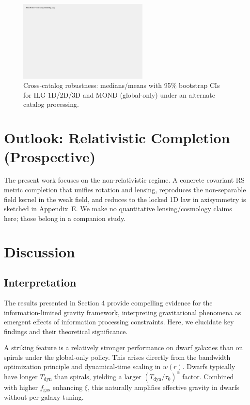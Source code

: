 \documentclass[fleqn,usenatbib]{mnras}
\begin{document}
\begin{figure}[h]
\centering
\includegraphics[width=0.58\textwidth]{results/robustness_crosscatalog.png}
\caption{Cross-catalog robustness: medians/means with 95\% bootstrap CIs for ILG 1D/2D/3D and MOND (global-only) under an alternate catalog processing.}
\label{fig:robustness_crosscatalog}
\end{figure}

\section{Outlook: Relativistic Completion (Prospective)}

The present work focuses on the non-relativistic regime. A concrete covariant RS metric completion that unifies rotation and lensing, reproduces the non-separable field kernel in the weak field, and reduces to the locked 1D law in axisymmetry is sketched in Appendix~E. We make no quantitative lensing/cosmology claims here; those belong in a companion study.

\section{Discussion}

\subsection{Interpretation}

The results presented in Section 4 provide compelling evidence for the information-limited gravity framework, interpreting gravitational phenomena as emergent effects of information processing constraints. Here, we elucidate key findings and their theoretical significance.

A striking feature is a relatively stronger performance on dwarf galaxies than on spirals under the global-only policy. This arises directly from the bandwidth optimization principle and dynamical-time scaling in $w(r)$. Dwarfs typically have longer $T_\mathrm{dyn}$ than spirals, yielding a larger $(T_\mathrm{dyn}/\tau_0)^\alpha$ factor. Combined with higher $f_\mathrm{gas}$ enhancing $\xi$, this naturally amplifies effective gravity in dwarfs without per-galaxy tuning.
\end{document}
